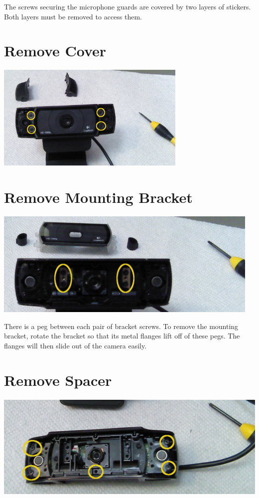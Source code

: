 The screws securing the microphone guards are covered by two layers of
stickers. Both layers must be removed to access them.

\section{Remove Cover}

\includegraphics[height=2in]{pics-c920/03-coverscrews.jpg}

\section{Remove Mounting Bracket}

\includegraphics[height=2in]{pics-c920/04-bracketscrews.jpg}

There is a peg between each pair of bracket screws. To remove the mounting
bracket, rotate the bracket so that its metal flanges lift off of these pegs.
The flanges will then slide out of the camera easily.

\section{Remove Spacer}

\includegraphics[height=2in]{pics-c920/05-spacerscrews.jpg}

